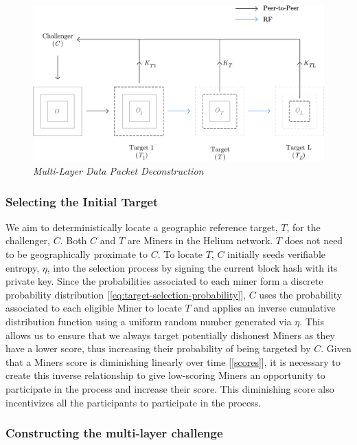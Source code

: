 \documentclass[10pt, nonatbib, nocopyrightspace, reprint]{sigplanconf}
\newcommand{\secref}[1]{[\autoref{#1}]}
\renewcommand{\eqref}[1]{[\autoref{#1}]}
\begin{document}
\begin{figure}[ht]
    \begin{center}
          \includegraphics[width=\columnwidth]{deconstruction.eps}
          \caption{\emph{Multi-Layer Data Packet Deconstruction}}\label{fig:poc-deconstruction}
     \end{center}
\end{figure}

\subsubsection{Selecting the Initial Target}

We aim to deterministically locate a geographic reference target, $T$, for the challenger, $C$. Both $C$ and $T$ are Miners in the Helium network. $T$ does not need to be geographically proximate to $C$. To locate $T$, $C$ initially seeds verifiable entropy, $\eta$, into the selection process by signing the current block hash with its private key. Since the probabilities associated to each miner form a discrete probability distribution \eqref{eq:target-selection-probability}, $C$ uses the probability associated to each eligible Miner to locate $T$ and applies an inverse cumulative distribution function using a uniform random number generated via $\eta$. This allows us to ensure that we always target potentially dishonest Miners as they have a lower score, thus increasing their probability of being targeted by $C$. Given that a Miners score is diminishing linearly over time \secref{scores}, it is necessary to create this inverse relationship to give low-scoring Miners an opportunity to participate in the process and increase their score. This diminishing score also incentivizes all the participants to participate in the process.

\subsubsection{Constructing the multi-layer challenge}
\end{document}
